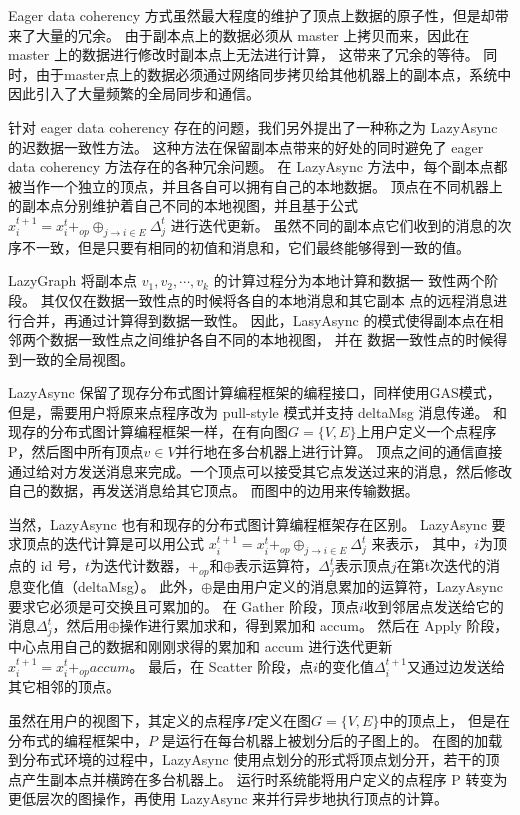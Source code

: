 Eager data coherency 方式虽然最大程度的维护了顶点上数据的原子性，但是却带来了大量的冗余。
由于副本点上的数据必须从 master 上拷贝而来，因此在 master 上的数据进行修改时副本点上无法进行计算，
这带来了冗余的等待。
同时，由于master点上的数据必须通过网络同步拷贝给其他机器上的副本点，系统中因此引入了大量频繁的全局同步和通信。

针对 eager data coherency 存在的问题，我们另外提出了一种称之为 LazyAsync 的迟数据一致性方法。
这种方法在保留副本点带来的好处的同时避免了 eager data coherency 方法存在的各种冗余问题。
在 LazyAsync 方法中，每个副本点都被当作一个独立的顶点，并且各自可以拥有自己的本地数据。
顶点在不同机器上的副本点分别维护着自己不同的本地视图，并且基于公式
$x_{i}^{t+1}=x_{i}^{t}+_{o p} \oplus_{j \rightarrow i \in E} \Delta_{j}^{t}$
进行迭代更新。
虽然不同的副本点它们收到的消息的次序不一致，但是只要有相同的初值和消息和，它们最终能够得到一致的值。

LazyGraph 将副本点 $v_1 , v_2 , \cdots , v_k$ 的计算过程分为本地计算和数据一 致性两个阶段。
其仅仅在数据一致性点的时候将各自的本地消息和其它副本 点的远程消息进行合并，再通过计算得到数据一致性。
因此，LasyAsync 的模式使得副本点在相邻两个数据一致性点之间维护各自不同的本地视图，
并在 数据一致性点的时候得到一致的全局视图。


LazyAsync 保留了现存分布式图计算编程框架的编程接口，同样使用GAS模式，
但是，需要用户将原来点程序改为 pull-style 模式并支持 deltaMsg 消息传递。
和现存的分布式图计算编程框架一样，在有向图$G = \{V, E\}$上用户定义一个点程序 P，然后图中所有顶点$v \in V$并行地在多台机器上进行计算。
顶点之间的通信直接通过给对方发送消息来完成。一个顶点可以接受其它点发送过来的消息，然后修改自己的数据，再发送消息给其它顶点。
而图中的边用来传输数据。


当然，LazyAsync 也有和现存的分布式图计算编程框架存在区别。
LazyAsync 要求顶点的迭代计算是可以用公式 $x_i^{t+1} = x_i^t +_{op} \oplus_{j \rightarrow i \in E} \Delta_j^t$ 来表示，
其中，$i$为顶点的 id 号，$t$为迭代计数器，$+_{op}$和$\oplus$表示运算符，$\Delta_j^t$表示顶点$j$在第t次迭代的消息变化值（deltaMsg）。
此外，$\oplus$是由用户定义的消息累加的运算符，LazyAsync 要求它必须是可交换且可累加的。
在 Gather 阶段，顶点$i$收到邻居点发送给它的消息$\Delta_j^t$，然后用$\oplus$操作进行累加求和，得到累加和 accum。
然后在 Apply 阶段，中心点用自己的数据和刚刚求得的累加和 accum 进行迭代更新$x_i^{t+1} = x_i^t +_{op} accum$。
最后，在 Scatter 阶段，点$i$的变化值$\Delta_i^{t+1}$又通过边发送给其它相邻的顶点。


虽然在用户的视图下，其定义的点程序$P$定义在图$G = \{V,E\}$中的顶点上，
但是在分布式的编程框架中，$P$ 是运行在每台机器上被划分后的子图上的。
在图的加载到分布式环境的过程中，LazyAsync 使用点划分的形式将顶点划分开，若干的顶点产生副本点并横跨在多台机器上。
运行时系统能将用户定义的点程序 P 转变为更低层次的图操作，再使用 LazyAsync 来并行异步地执行顶点的计算。

